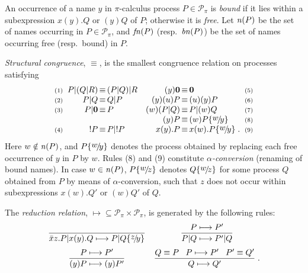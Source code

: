 \documentclass[runningheads]{llncs}
\newcommand{\T}{\mathcal{P}}             %
\newcommand{\n}{{\it n}}                 %
\newcommand{\bn}{{\it bn}}               %
\newcommand{\fn}{{\it fn}}               %
\newcommand{\subs}[2]{\{\mathord{\raisebox{2pt}[0pt]{$#1$}\!/\!#2}\}} %
\renewcommand{\nu}{}
\newcommand{\equred}{\mathrel{\equiv}}
\begin{document}
\begin{definition}\rm\label{df:structural congruence}
An occurrence of a name $y$ in $\pi$-calculus process $P\in\T_\pi$ is \emph{bound} if it lies
within a subexpression $x(y).Q$ or $(\nu y)Q$ of $P$; otherwise it is \emph{free}.
Let $\n(P)$ be the set of names occurring in $P\in \T_\pi$,
and $\fn(P)$ (resp.\ $\bn(P)$) be the set of names occurring free (resp.\ bound) in $P$.

\emph{Structural congruence}, $\equred$, is the smallest congruence relation on processes satisfying\vspace{-2ex}
\[
\begin{array}[b]{@{}l@{\;\;}r@{~\!\equred\!~}l@{\hspace{10pt}}r@{~\!\equred\!~}l@{\;\;}r@{}}
\scriptstyle (1)& P | (Q | R) & (P | Q) | R &
(\nu y) \textbf{0} & \textbf{0} & \scriptstyle (5)\\

\scriptstyle (2)& P | Q & Q | P &
(\nu y)(\nu u)P & (\nu u)(\nu y) P & \scriptstyle (6)\\

\scriptstyle (3)& P | \textbf{0} & P &
(\nu w) (P | Q) & P | (\nu w)Q  & \scriptstyle (7)\\

& \multicolumn{2}{c}{} &
(\nu y)P & (\nu w)P\subs{w}{y} & \scriptstyle (8)\\

\scriptstyle (4)& !P & P | !P &
x(y).P & x(w).P\subs{w}{y}\;.  & \scriptstyle (9)\\
\end{array}
\]
Here $w\notin\n(P)$, and $P\subs{w}{y}$ denotes the process
obtained by replacing each free occurrence of $y$ in $P$ by $w$.
Rules (8) and (9) constitute \emph{$\alpha$-conversion} (renaming of bound names).
In case $w \in\n(P)$, $P\subs{w}{z}$ denotes $Q\subs{w}{z}$ for some process $Q$ obtained from $P$
by means of $\alpha$-conversion, such that $z$ does not occur within subexpressions $x(w).Q'$ or $(\nu w)Q'$ of $Q$.
\end{definition}

\begin{definition}\rm\label{df:reduction}
The \emph{reduction relation}, ${\longmapsto}\subseteq \T_\pi \times \T_\pi$, is generated by the
following rules:\vspace{-2ex}
\[\begin{array}{@{}cc@{}}
\displaystyle\frac{~}{\bar xz.P | x(y).Q \longmapsto P|Q\subs{z}{y}} &
\displaystyle\frac{P \longmapsto P'}{P|Q \longmapsto P'|Q} \\[3ex]
\displaystyle\frac{P \longmapsto P'}{(\nu y)P \longmapsto (\nu y)P'} &
\displaystyle\frac{Q \equred P \quad\! P \longmapsto P' \quad\! P' \equred Q'}{Q \longmapsto Q'}\;.
\end{array}\]
\end{definition}
\end{document}
